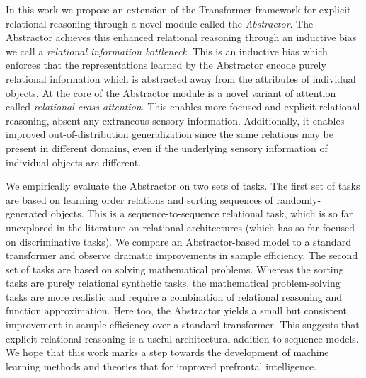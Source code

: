 In this work we propose an extension of the Transformer framework for explicit relational reasoning through a novel module called the \textit{Abstractor}. The Abstractor achieves this enhanced relational reasoning through an inductive bias we call a \textit{relational information bottleneck}. This is an inductive bias which enforces that the representations learned by the Abstractor encode purely relational information which is abstracted away from the attributes of individual objects. At the core of the Abstractor module is a novel variant of attention called \textit{relational cross-attention}. This enables more focused and explicit relational reasoning, absent any extraneous sensory information. Additionally, it enables improved out-of-distribution generalization since the same relations may be present in different domains, even if the underlying sensory information of individual objects are different.

We empirically evaluate the Abstractor on two sets of tasks. The first set of tasks are based on learning order relations and sorting sequences of randomly-generated objects. This is a sequence-to-sequence relational task, which is so far unexplored in the literature on relational architectures (which has so far focused on discriminative tasks). We compare an Abstractor-based model to a standard transformer and observe dramatic improvements in sample efficiency. The second set of tasks are based on solving mathematical problems. Whereas the sorting tasks are purely relational synthetic tasks, the mathematical problem-solving tasks are more realistic and require a combination of relational reasoning and function approximation. Here too, the Abstractor yields a small but consistent improvement in sample efficiency over a standard transformer. This suggests that explicit relational reasoning is a useful architectural addition to sequence models. We hope that this work marks a step towards the development of machine learning methods and theories that for improved prefrontal intelligence.

